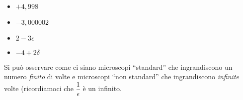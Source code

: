 \begin{esempio}
~

\begin{multicols}{4}
\begin{itemize}[nosep]
 \item \(+4,998\)
 \item \(-3,000002\)
 \item \(2-3\epsilon\)
 \item \(-4+2\delta\)
\end{itemize}
\end{multicols}

\begin{inaccessibleblock}
\begin{minipage}{.48\linewidth}
 \begin{center}
\scalebox{0.7}{\microscopioa}
 \end{center}
\end{minipage}
\hfill
\begin{minipage}{.48\linewidth}
 \begin{center}
\scalebox{0.7}{\microscopiob}
 \end{center}
\end{minipage}
\end{inaccessibleblock}

\begin{inaccessibleblock}
\begin{minipage}{.48\linewidth}
 \begin{center}
\scalebox{0.7}{\microscopioc}
 \end{center}
\label{fig:microscopioc}
\end{minipage}
\hfill
\begin{minipage}{.48\linewidth}
 \begin{center}
\scalebox{0.7}{\microscopiod}
 \end{center}
\end{minipage}
\end{inaccessibleblock}
\end{esempio}
 
Si può osservare come ci siano microscopi ``standard'' che ingrandiscono un 
numero \emph{finito} di volte e microscopi ``non standard'' che 
ingrandiscono \emph{infinite} volte (ricordiamoci che \(\dfrac{1}{\epsilon}\) 
è un infinito.

